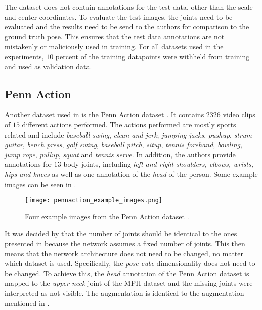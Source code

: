The dataset does not contain annotations for the test data, other than the scale and center coordinates.
To evaluate the test images, the joints need to be evaluated and the results need to be send to the authors for comparison to the ground truth pose.
This ensures that the test data annotations are not mistakenly or maliciously used in training.
For all datasets used in the experiments, $10$ percent of the training datapoints were withheld from training and used as validation data.

\subsection{Penn Action}
\label{sec:exp-penn}

Another dataset used in \cite{luvizon_2d/3d_2018} is the Penn Action dataset \cite{zhang_actemes_2013}.
It contains $2326$ video clips of $15$ different actions performed.
The actions performed are mostly sports related and include \textit{baseball swing}, \textit{clean and jerk}, \textit{jumping jacks}, \textit{pushup}, \textit{strum guitar}, \textit{bench press}, \textit{golf swing}, \textit{baseball pitch}, \textit{situp}, \textit{tennis forehand}, \textit{bowling}, \textit{jump rope}, \textit{pullup}, \textit{squat} and \textit{tennis serve}.
In addition, the authors provide annotations for $13$ body joints,
including \textit{left and right shoulders, elbows, wrists, hips and knees} as well as one annotation of the \textit{head} of the person.
Some example images can be seen in . 

\begin{figure}[htb!]
    \centering
    \texttt{[image: pennaction\_example\_images.png]}
    \caption{Four example images from the Penn Action dataset \cite{zhang_actemes_2013}. }
    \label{fig:pennaction_example_images}
\end{figure}

It was decided by \cite{luvizon_2d/3d_2018} that the number of joints should be identical to the ones presented in \cite{andriluka_2d_2014}  because the network assumes a fixed number of joints.
This then means that the network architecture does not need to be changed, no matter which dataset is used.
Specifically, the \textit{pose cube} dimensionality does not need to be changed.
To achieve this, the \textit{head} annotation of the Penn Action dataset is mapped to the \textit{upper neck} joint of the MPII dataset and the missing joints were interpreted as not visible.
The augmentation is identical to the augmentation mentioned in .

